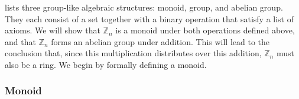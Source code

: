 \documentclass[10pt, titlepage]{amsart}
\newcommand\Z{{\mathbb Z}}
\newtheorem{prop}{Proposition}[subsection]
\theoremstyle{definition}
\begin{document}
%	
%

	 lists three group-like algebraic structures: monoid, group, and abelian group. 
	They each consist of a set together with a binary operation that satisfy a list of axioms. We will show that $\Z_n$ is a monoid under both operations defined above, and that $\Z_n$ forms an abelian group under addition. This will lead to the conclusion that, since this multiplication distributes over this addition, $\Z_n$ must also be a ring. We begin by formally defining a monoid.


	\subsubsection{Monoid}
	
\end{document}
